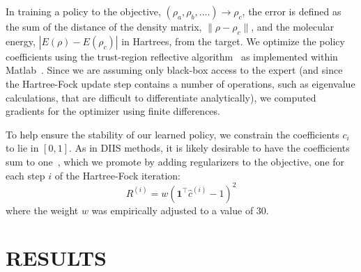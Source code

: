 \documentclass[twoside,11pt]{article}
\begin{document}

In training a policy to the objective, $(\rho_a, \rho_b, ....) \rightarrow \rho_c $, the error is defined as the sum of the distance of the density matrix, $\|\rho-\rho_c\|$, and the molecular energy, $|E(\rho)-E(\rho_c)|$ in Hartrees, from the target. We optimize the policy coefficients using the trust-region reflective algorithm~\citep{Coleman1996} as implemented within Matlab~\citep{Matlab}.  Since we are assuming only black-box access to the expert (and since the Hartree-Fock update step contains a number of operations, such as eigenvalue calculations, that are difficult to differentiate analytically), we computed gradients for the optimizer using finite differences.

To help ensure the stability of our learned policy, we constrain the coefficients $c_i$ to lie in $[0, 1]$. As in DIIS methods, it is likely desirable to have the coefficients sum to one~\citep{EDIIS}, which we promote by adding regularizers to the objective, one for each step $i$ of the Hartree-Fock iteration:
\begin{equation}
R^{(i)} =  w  (\mathbf 1^\top \hat{c}^{(i)} - 1)^2
\end{equation}
where the weight $w$ was empirically adjusted to a value of 30.


\section{RESULTS}
\end{document}
